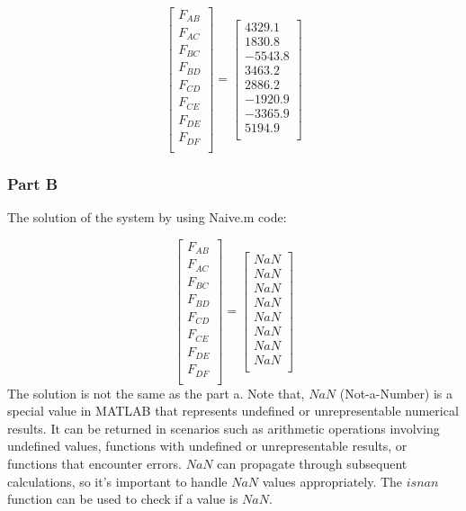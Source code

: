 \documentclass[12pt, a4paper]{article}
\begin{document}
\begin{equation}
\begin{bmatrix}
F_{A B} \\
F_{A C} \\
F_{B C} \\
F_{B D} \\
F_{C D} \\
F_{C E} \\
F_{D E} \\
F_{D F} \\
\end{bmatrix}= 
\begin{bmatrix}
4329.1\\
1830.8\\
-5543.8\\
3463.2\\
2886.2\\
-1920.9\\
-3365.9\\
5194.9\\
\end{bmatrix}
\end{equation}
\subsubsection{Part B}
The solution of the system by using Naive.m code:

\begin{equation}
\begin{bmatrix}
F_{A B} \\
F_{A C} \\
F_{B C} \\
F_{B D} \\
F_{C D} \\
F_{C E} \\
F_{D E} \\
F_{D F} \\
\end{bmatrix}= 
\begin{bmatrix}
NaN\\
NaN\\
NaN\\
NaN\\
NaN\\
NaN\\
NaN\\
NaN\\
\end{bmatrix}\end{equation}
The solution is not the same as the part a.
Note that, $NaN$ (Not-a-Number) is a special value in MATLAB that represents undefined or unrepresentable numerical results. It can be returned in scenarios such as arithmetic operations involving undefined values, functions with undefined or unrepresentable results, or functions that encounter errors. $NaN$ can propagate through subsequent calculations, so it's important to handle $NaN$ values appropriately. The $isnan$ function can be used to check if a value is $NaN$.
\end{document}
